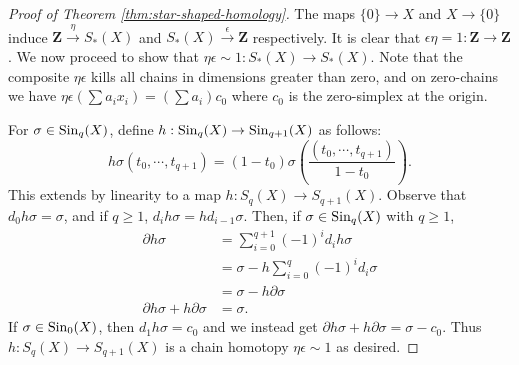 \begin{proof}[Proof of Theorem \ref{thm:star-shaped-homology}]
	The maps $\{0\}\to X$ and $X\to \{0\}$ induce $\mathbf{Z}\xrightarrow{\eta}S_\ast(X)$ and $S_\ast(X)\xrightarrow{\epsilon}\mathbf{Z}$ respectively. It is clear that $\epsilon\eta = 1:\mathbf{Z}\to\mathbf{Z}$. We now proceed to show that $\eta\epsilon\sim 1:S_\ast(X)\to S_\ast(X)$. Note that the composite $\eta \epsilon$ kills all chains in dimensions greater than zero, and on zero-chains we have $\eta\epsilon(\sum a_ix_i)=(\sum a_i)c_0$ where $c_0$ is the zero-simplex at the origin.
	
	For $\sigma\in\mathrm{Sin}_q(X)$, define $h:\mathrm{Sin}_q(X)\to\mathrm{Sin}_{q+1}(X)$ as follows:
	$$h\sigma(t_0,\cdots,t_{q+1})=(1-t_0)\sigma\left(\frac{(t_0,\cdots,t_{q+1})}{1-t_0}\right).$$
	This extends by linearity to a map $h:S_q(X)\to S_{q+1}(X)$.
	Observe that $d_0 h \sigma = \sigma$, and if $q \geq 1$, $d_i h \sigma = h d_{i-1} \sigma$. Then, if $\sigma \in \mathrm{Sin}_q(X)$ with $q \geq 1$,
	\begin{align*}
		\partial h \sigma &= \sum_{i=0}^{q+1} (-1)^{i} d_i h\sigma\\
		&= \sigma - h \sum_{i=0}^q (-1)^i d_i \sigma\\
		&= \sigma - h\partial \sigma\\
		\partial h \sigma + h \partial \sigma &= \sigma.
	\end{align*}
	If $\sigma \in \mathrm{Sin}_0(X)$, then $d_1 h \sigma = c_0$ and we instead get $\partial h \sigma + h \partial \sigma = \sigma - c_0$. Thus $h:S_q(X)\to S_{q+1}(X)$ is a chain homotopy $\eta \epsilon \sim 1$ as desired.
\end{proof}
